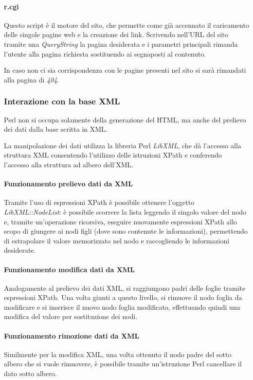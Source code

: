 \paragraph*{r.cgi}Questo script \`e il motore del sito, che permette come gi\`a accennato il caricamento delle singole pagine web e la creazione dei link. Scrivendo nell'URL del sito tramite una \textit{QueryString} la pagina desiderata e i parametri principali rimanda l'utente alla pagina richiesta sostituendo ai segnaposti al contenuto.

In caso non ci sia corrispondenza con le pagine presenti nel sito si sar\`a rimandati alla pagina di \textit{404}.

\subsubsection{Interazione con la base XML}
Perl non si occupa solamente della generazione del HTML, ma anche del prelievo dei dati dalla base scritta in XML.

La manipolazione dei dati utilizza la libreria Perl \textit{LibXML}, che d\`a l'accesso alla struttura XML consentendo l'utilizzo delle istruzioni XPath e conferendo l'accesso alla struttura ad albero dell'XML.

\paragraph*{Funzionamento prelievo dati da XML}Tramite l'uso di espressioni XPath \`e possibile ottenere l'oggetto \textit{LibXML::NodeList}: \`e possibile scorrere la lista leggendo il singolo valore del nodo e, tramite un'operazione ricorsiva, eseguire nuovamente espressioni XPath allo scopo di giungere ai nodi figli (dove sono contenute le informazioni), permettendo di estrapolare il valore memorizzato nel nodo e raccogliendo le informazioni desiderate.

\paragraph*{Funzionamento modifica dati da XML}Analogamente al prelievo dei dati XML, si raggiungono padri delle foglie tramite espressioni XPath. Una volta giunti a questo livello, si rimuove il nodo foglia da modificare e si inserisce il nuovo nodo foglia modificato, effettuando quindi una modifica del valore per sostituzione dei nodi.

\paragraph*{Funzionamento rimozione dati da XML}Similmente per la modifica XML, una volta ottenuto il nodo padre del sotto albero che si vuole rimuovere, \`e possibile tramite un'istruzione Perl cancellare il dato sotto albero.


